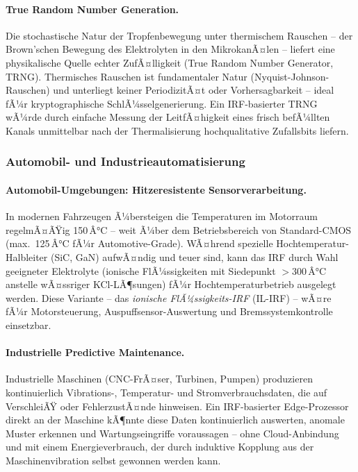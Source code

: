 ﻿\documentclass[a4paper,12pt]{scrreprt}
\theoremstyle{definition}
\begin{document}
\paragraph{True Random Number Generation.}
Die stochastische Natur der Tropfenbewegung unter thermischem Rauschen
-- der Brown'schen Bewegung des Elektrolyten in den MikrokanÃ¤len --
liefert eine physikalische Quelle echter ZufÃ¤lligkeit (True Random Number
Generator, TRNG). Thermisches Rauschen ist fundamentaler Natur
(Nyquist-Johnson-Rauschen) und unterliegt keiner PeriodizitÃ¤t oder
Vorhersagbarkeit -- ideal fÃ¼r kryptographische SchlÃ¼sselgenerierung.
Ein IRF-basierter TRNG wÃ¼rde durch einfache Messung der LeitfÃ¤higkeit
eines frisch befÃ¼llten Kanals unmittelbar nach der Thermalisierung
hochqualitative Zufallsbits liefern.

\subsubsection{Automobil- und Industrieautomatisierung}
\label{subsubsec:automobil}

\paragraph{Automobil-Umgebungen: Hitzeresistente Sensorverarbeitung.}
In modernen Fahrzeugen Ã¼bersteigen die Temperaturen im Motorraum
regelmÃ¤ÃŸig 150\,Â°C -- weit Ã¼ber dem Betriebsbereich von Standard-CMOS
(max.\ 125\,Â°C fÃ¼r Automotive-Grade). WÃ¤hrend spezielle
Hochtemperatur-Halbleiter (SiC, GaN) aufwÃ¤ndig und teuer sind,
kann das IRF durch Wahl geeigneter Elektrolyte (ionische FlÃ¼ssigkeiten
mit Siedepunkt $> 300$\,Â°C anstelle wÃ¤ssriger KCl-LÃ¶sungen) fÃ¼r
Hochtemperaturbetrieb ausgelegt werden. Diese Variante -- das
\emph{ionische FlÃ¼ssigkeits-IRF} (IL-IRF) -- wÃ¤re fÃ¼r Motorsteuerung,
Auspuffsensor-Auswertung und Bremssystemkontrolle einsetzbar.

\paragraph{Industrielle Predictive Maintenance.}
Industrielle Maschinen (CNC-FrÃ¤ser, Turbinen, Pumpen) produzieren
kontinuierlich Vibrations-, Temperatur- und Stromverbrauchsdaten,
die auf VerschleiÃŸ oder FehlerzustÃ¤nde hinweisen. Ein IRF-basierter
Edge-Prozessor direkt an der Maschine kÃ¶nnte diese Daten kontinuierlich
auswerten, anomale Muster erkennen und Wartungseingriffe voraussagen --
ohne Cloud-Anbindung und mit einem Energieverbrauch, der durch
induktive Kopplung aus der Maschinenvibration selbst gewonnen werden kann.
\end{document}
